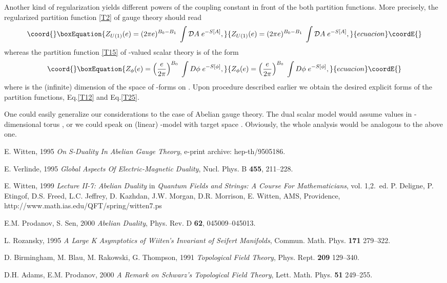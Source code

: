 \documentclass[a4paper,12pt]{article}
\begin{document}
Another kind of regularization yields different powers of the
coupling constant \coordHE{} in front of the both partition functions.
More precisely, the regularized partition function \eqref{T2} of \coordHE{} gauge theory should read
\begin{equation}\coord{}\boxEquation{\label{T31}
Z_{U(1)}(e) = (2 \pi e)^{B_{0}-B_{1}}\; \int\mathcal{D}A\; e^{- S[A]},
}{Z_{U(1)}(e) = (2 \pi e)^{B_{0}-B_{1}}\; \int\mathcal{D}A\; e^{- S[A]},
}{ecuacion}\coordE{}\end{equation}
whereas the partition function \eqref{T15} of \coordHE{}-valued scalar theory is of the form
\begin{equation}\coord{}\boxEquation{\label{T32}
Z_{\phi} (e) =\left(\frac{e}{2 \pi}\right)^{B_{0}}\; \int D\phi \; e^{-S[\phi]},
}{Z_{\phi} (e) =\left(\frac{e}{2 \pi}\right)^{B_{0}}\; \int D\phi \; e^{-S[\phi]},
}{ecuacion}\coordE{}\end{equation}
where \coordHE{} is the (infinite) dimension of the space of \coordHE{}-forms on \coordHE{}.
Upon procedure described earlier we obtain the desired explicit forms of the partition functions, Eq.\eqref{T12} and
Eq.\eqref{T25}.

One could easily generalize our considerations to the case of
Abelian \coordHE{} gauge theory. The dual scalar model would
assume values in \coordHE{}-dimensional torus \coordHE{}, or we could speak
on (linear) \myHighlight{$\sigma$}\coordHE{}-model with target space \coordHE{}. Obviously,
the whole analysis would be analogous to the above one.
\begin{thebibliography}{99}

\label{B01} E. Witten, 1995  {\it On S-Duality In Abelian Gauge Theory},
e-print archive: hep-th/9505186.

\label{B02} E. Verlinde, 1995  {\it Global Aspects Of Electric-Magnetic Duality},
Nucl. Phys.  B {\bf 455}, 211--228.

\label{B03} E. Witten, 1999 {\it Lecture II-7: Abelian Duality} in {\it Quantum
Fields and Strings: A Course For Mathematicians}, vol. 1,2.\, ed.
P. Deligne, P. Etingof, D.S. Freed, L.C. Jeffrey, D. Kazhdan, J.W. Morgan, D.R. Morrison, E. Witten, AMS, Providence,
http://www.math.ias.edu/QFT/spring/witten7.ps

\label{B04} E.M. Prodanov, S. Sen, 2000
{\it Abelian Duality}, Phys. Rev. D {\bf 62}, 045009--045013.

\label{B05} L. Rozansky, 1995 {\it A Large K
Asymptotics of Wiiten's Invariant of Seifert Manifolds}, Commun.
Math. Phys. {\bf 171} 279--322.

\label{B06}
D. Birmingham, M. Blau, M. Rakowski, G. Thompson, 1991 {\it
Topological Field Theory}, Phys. Rept. {\bf 209} 129--340.

\label{B07} D.H. Adams, E.M. Prodanov, 2000 {\it A Remark
on Schwarz's Topological Field Theory}, Lett. Math. Phys. {\bf 51}
249--255.

\end{thebibliography}
\end{document}
